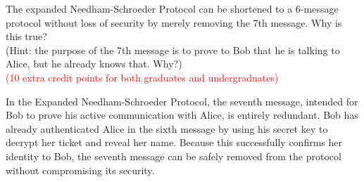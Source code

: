 \item[\textbf{Problem 15}]
The expanded Needham-Schroeder Protocol can be shortened to a 6-message protocol
without loss of security by merely removing the 7th message. Why is this true?   \\
(Hint: the purpose of the 7th message is to prove to Bob that he is talking to
Alice, but he already knows that. Why?)                                          \\
\textcolor{red}{(10 extra credit points for both graduates and undergraduates)}

\Solution

In the Expanded Needham-Schroeder Protocol, the seventh message, intended for
Bob to prove his active communication with Alice, is entirely redundant. Bob has
already authenticated Alice in the sixth message by using his secret key to
decrypt her ticket and reveal her name. Because this successfully confirms her
identity to Bob, the seventh message can be safely removed from the protocol
without compromising its security.
